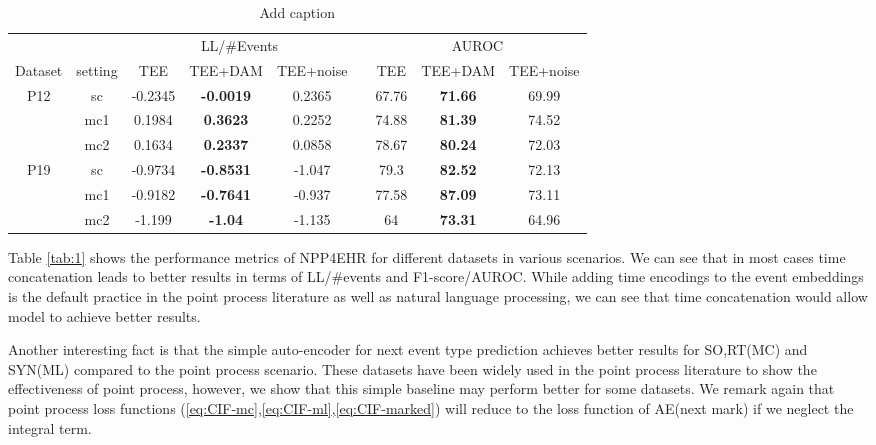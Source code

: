 \documentclass[journal,twoside,web]{ieeecolor}
\begin{document}
 
  
\begin{table}[htbp]
    \centering
    \caption{Add caption}
      \begin{tabular}{ccccccccc}
      \toprule
      \toprule
            &       & \multicolumn{3}{c}{LL/\#Events} &       & \multicolumn{3}{c}{AUROC} \\
  \cmidrule{3-5}\cmidrule{7-9}    Dataset & setting & TEE   & TEE+DAM & TEE+noise &       & TEE   & TEE+DAM & TEE+noise \\
      \midrule
      \multirow{3}[2]{*}{P12} & sc    & -0.2345 & \textbf{-0.0019} & 0.2365 &       & 67.76 & \textbf{71.66} & 69.99 \\
            & mc1   & 0.1984 & \textbf{0.3623} & 0.2252 &       & 74.88 & \textbf{81.39} & 74.52 \\
            & mc2   & 0.1634 & \textbf{0.2337} & 0.0858 &       & 78.67 & \textbf{80.24} & 72.03 \\
      \midrule
      \multirow{3}[2]{*}{P19} & sc    & -0.9734 & \textbf{-0.8531} & -1.047 &       & 79.3  & \textbf{82.52} & 72.13 \\
            & mc1   & -0.9182 & \textbf{-0.7641} & -0.937 &       & 77.58 & \textbf{87.09} & 73.11 \\
            & mc2   & -1.199 & \textbf{-1.04} & -1.135 &       & 64    & \textbf{73.31} & 64.96 \\
      \bottomrule
      \bottomrule
      \end{tabular}%
    \label{tab:2}%
  \end{table}%

Table \ref{tab:1} shows the performance metrics of NPP4EHR for different datasets in various scenarios. We can see that in most cases time concatenation leads to better results in terms of LL/\#events and F1-score/AUROC. While adding time encodings to the event embeddings is the default practice in the point process literature \cite*{zhangSelfAttentiveHawkesProcess2020,zuoTransformerHawkesProcess2020a} as well as natural language processing, we can see that time concatenation would allow model to achieve better results.

Another interesting fact is that the simple auto-encoder for next event type prediction achieves better results for SO,RT(MC) and SYN(ML) compared to the point process scenario. These datasets have been widely used in the point process literature to show the effectiveness of point process, however, we show that this simple baseline may perform better for some datasets. We remark again that point process loss functions (\ref*{eq:CIF-mc},\ref*{eq:CIF-ml},\ref*{eq:CIF-marked}) will reduce to the loss function of AE(next mark) if we neglect the integral term.
\end{document}
